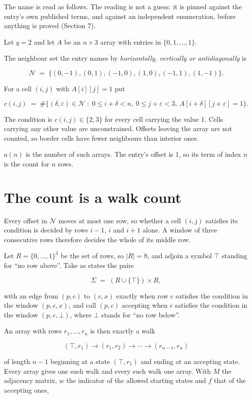 \documentclass[11pt]{article}
\theoremstyle{definition}
\begin{document}
The name is read as follows. The reading is not a guess: it is pinned against the entry's own published terms, and against an independent enumeration, before anything is proved (Section 7).

Let $q = 2$ and let $A$ be an $n \times 3$ array with entries in $\{0,1,\dots,1\}$.

The neighbour set the entry names by {\itshape horizontally, vertically or antidiagonally} is

\[\mathcal{N} \;=\; \{(0,-1), (0,1), (-1,0), (1,0), (-1,1), (1,-1)\}.\]

For a cell $(i,j)$ with $A[i][j] = 1$ put

\[c(i,j) \;=\; \#\bigl\{(\delta,\varepsilon)\in\mathcal{N} \;:\; 0\le i+\delta<n,\ 0\le j+\varepsilon<3,\ A[i+\delta][j+\varepsilon] = 1\bigr\}.\]

The condition is $c(i,j) \in \{2, 3\}$ for every cell carrying the value 1. Cells carrying any other value are unconstrained. Offsets leaving the array are not counted, so border cells have fewer neighbours than interior ones.

$a(n)$ is the number of such arrays. The entry's offset is 1, so its term of index $n$ is the count for $n$ rows.

\section{The count is a walk count}

Every offset in $\mathcal{N}$ moves at most one row, so whether a cell $(i,j)$ satisfies its condition is decided by rows $i-1$, $i$ and $i+1$ alone. A window of three consecutive rows therefore decides the whole of its middle row.

Let $R = \{0,\dots,1\}^{3}$ be the set of rows, so $|R| = 8$, and adjoin a symbol $\top$ standing for ``no row above''. Take as states the pairs

\[\Sigma \;=\; (R \cup \{\top\}) \times R,\]

with an edge from $(p,c)$ to $(c,x)$ exactly when row $c$ satisfies the condition in the window $(p,c,x)$, and call $(p,c)$ accepting when $c$ satisfies the condition in the window $(p,c,\bot)$, where $\bot$ stands for ``no row below''.

An array with rows $r_1,\dots,r_n$ is then exactly a walk

\[(\top,r_1) \to (r_1,r_2) \to \cdots \to (r_{n-1},r_n)\]

of length $n-1$ beginning at a state $(\top,r_1)$ and ending at an accepting state. Every array gives one such walk and every such walk one array. With $M$ the adjacency matrix, $w$ the indicator of the allowed starting states and $f$ that of the accepting ones,
\end{document}
